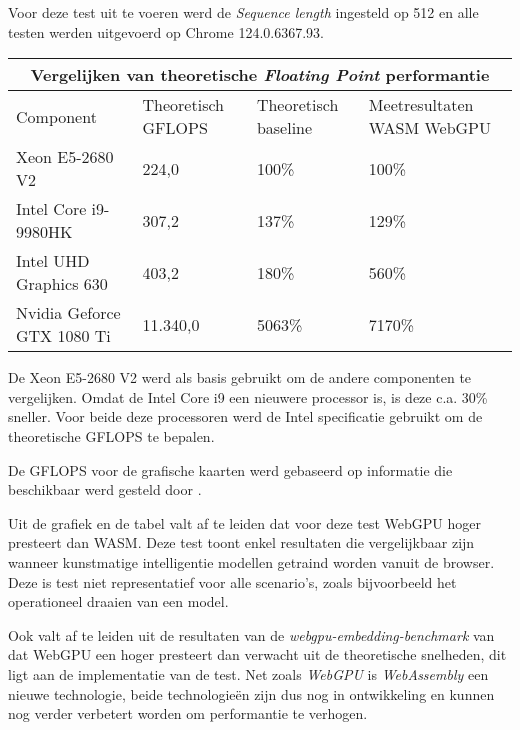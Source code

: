 \bigbreak{}

Voor deze test uit te voeren werd de \textit{Sequence length} ingesteld op 512 en alle testen werden uitgevoerd op Chrome 124.0.6367.93.

\break{}

\begin{tabular}{ |p{5cm}|p{3cm}|p{3cm}|p{3cm}|  }
    \hline
    \multicolumn{4}{|c|}{Vergelijken van theoretische \textit{Floating Point} performantie} \\
    \hline
    Component& Theoretisch GFLOPS & Theoretisch baseline & Meetresultaten WASM WebGPU\\
    \hline
        Xeon E5-2680 V2             & 224,0     & 100\%  & 100\%       \\
        Intel Core i9-9980HK        & 307,2     & 137\%  & 129\%    \\
        Intel UHD Graphics 630      & 403,2     & 180\%  & 560\%    \\
        Nvidia Geforce GTX 1080 Ti  & 11.340,0  & 5063\% & 7170\%   \\
    \hline
\end{tabular}

\bigbreak{}

De Xeon E5-2680 V2 werd als basis gebruikt om de andere componenten te vergelijken. Omdat de Intel Core i9 een nieuwere processor is, is deze c.a. 30\% sneller. Voor beide deze processoren werd de Intel specificatie gebruikt om de theoretische GFLOPS te bepalen. \autocite{Intel2024, Intel2024a}

\bigbreak{}

De GFLOPS voor de grafische kaarten werd gebaseerd op informatie die beschikbaar werd gesteld door \textcite{TechPowerUp2017, TechPowerUp2017a}.

\bigbreak{}

Uit de grafiek en de tabel valt af te leiden dat voor deze test WebGPU hoger presteert dan WASM. Deze test toont enkel resultaten die vergelijkbaar zijn wanneer kunstmatige intelligentie modellen getraind worden vanuit de browser. Deze is test niet representatief voor alle scenario's, zoals bijvoorbeeld het operationeel draaien van een model.

\bigbreak{}

Ook valt af te leiden uit de resultaten van de \textit{webgpu-embedding-benchmark} van \textcite{Lochner2024} dat WebGPU een hoger presteert dan verwacht uit de theoretische snelheden, dit ligt aan de implementatie van de test. Net zoals \textit{WebGPU} is \textit{WebAssembly} een nieuwe technologie, beide technologieën zijn dus nog in ontwikkeling en kunnen nog verder verbetert worden om performantie te verhogen.

